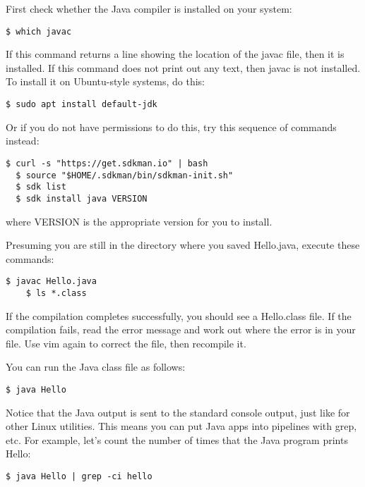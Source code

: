 \documentclass{article}
\begin{document}
First check whether the Java compiler is installed on your system:

\begin{lstlisting}[style=BashInputStyle]
    $ which javac
\end{lstlisting}

If this command returns a line showing the location of the javac file, then it is installed. If this command does not print out any text, then javac is not installed. To install it on Ubuntu-style systems, do this:

\begin{lstlisting}[style=BashInputStyle]
    $ sudo apt install default-jdk
\end{lstlisting}

Or if you do not have permissions to do this, try this sequence of commands instead:
\begin{lstlisting}[style=BashInputStyle]
  $ curl -s "https://get.sdkman.io" | bash
  $ source "$HOME/.sdkman/bin/sdkman-init.sh"
  $ sdk list
  $ sdk install java VERSION
\end{lstlisting}

where VERSION is the appropriate version for you to install.


Presuming you are still in the directory where you saved Hello.java, execute these commands:

\begin{lstlisting}[style=BashInputStyle]
    $ javac Hello.java
    $ ls *.class
\end{lstlisting}

If the compilation completes successfully, you should see a Hello.class file. If the compilation fails, read the error message and work out where the error is in your file. Use vim again to correct the file, then recompile it.

You can run the Java class file as follows:
\begin{lstlisting}[style=BashInputStyle]
    $ java Hello
\end{lstlisting}

Notice that the Java output is sent to the standard console output, just like for other Linux utilities. This means you can put Java apps into pipelines with grep, etc. For example, let's count the number of times that the Java program prints Hello:
\begin{lstlisting}[style=BashInputStyle]
    $ java Hello | grep -ci hello
\end{lstlisting}
\end{document}
